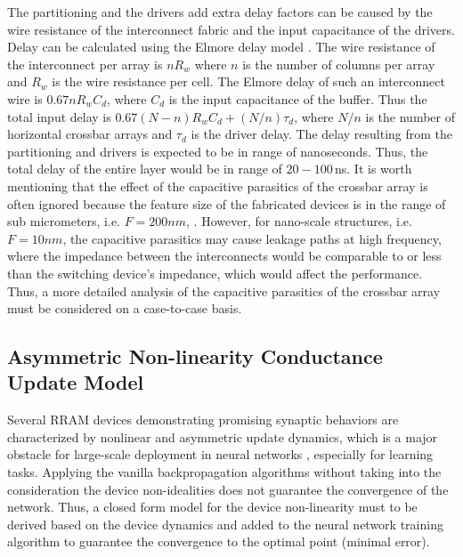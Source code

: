 \documentclass[english]{article}
\renewcommand{\cite}{\citep}
\begin{document}
The partitioning and the drivers add extra delay factors can be caused by the wire resistance of the interconnect fabric and the input capacitance of the drivers. 
Delay can be calculated using the Elmore delay model \cite{Fouda_etal18_modeanal}. 
The wire resistance of the interconnect per array is $nR_w$ where $n$ is the number of columns per array and $R_w$ is the wire resistance per cell. 
The Elmore delay of such an interconnect wire is $0.67nR_wC_d$, where $C_d$ is the input capacitance of the buffer. Thus the total input delay is $0.67(N-n)R_wC_d+(N/n)\tau_d$, where $N/n$ is the number of horizontal crossbar arrays and $\tau_d$ is the driver delay. The delay resulting from the partitioning and drivers is expected to be in range of nanoseconds. Thus, the total delay of the entire layer would be in range of $20-100\,$ns. %
It is worth mentioning that the effect of the capacitive parasitics of the crossbar array is often ignored because the feature size of the fabricated devices is in the range of sub micrometers, i.e. $F=200nm$, \cite{Prezioso_etal15_traioper}. However, for nano-scale structures, i.e. $F=10nm$, the capacitive parasitics may cause leakage paths at high frequency, where the impedance between the interconnects would be comparable to or less than the switching device's impedance, which would affect the performance. Thus, a more detailed analysis of the capacitive parasitics of the crossbar array must be considered on a case-to-case basis.

\subsection{Asymmetric Non-linearity Conductance Update Model}
Several RRAM devices demonstrating promising synaptic behaviors are characterized by nonlinear and asymmetric update dynamics, which is a major obstacle for large-scale deployment in neural networks \cite{yu2018neuro}, especially for learning tasks. Applying the vanilla backpropagation algorithms without taking into the consideration the device non-idealities does not guarantee the convergence of the network. Thus, a closed form model for the device non-linearity must to be derived based on the device dynamics and added to the neural network training algorithm to guarantee the convergence to the optimal point (minimal error). 
\end{document}
